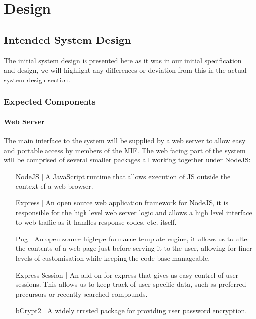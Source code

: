 \chapter{Design}
\label{ch:design}
\section{Intended System Design}
The initial system design is presented here as it was in our initial specification and design, we will highlight any differences or deviation from this in the actual system design section.

\subsection{Expected Components}
\subsubsection{Web Server}
The main interface to the system will be supplied by a web server to allow easy and portable access by members of the MIF. The web facing part of the system will be comprised of several smaller packages all working together under NodeJS:

\begin{enumerate}[label = {}, leftmargin=\widthof{Express-Session |}+\labelsep]
	\item[NodeJS |] A JavaScript runtime that allows execution of JS outside the context of a web browser. 
	
	\item[Express |] An open source web application framework for NodeJS, it is responsible for the high level web server logic and allows a high level interface to web traffic as it handles response codes, etc. itself.
	
	\item[Pug |] An open source high-performance template engine, it allows us to alter the contents of a web page just before serving it to the user, allowing for finer levels of customisation while keeping the code base manageable.
			
	\item[Express-Session |] An add-on for express that gives us easy control of user sessions. This allows us to keep track of user specific data, such as preferred precursors or recently searched compounds.
	
	\item[bCrypt2 |] A widely trusted package for providing user password encryption.
\end{enumerate}

